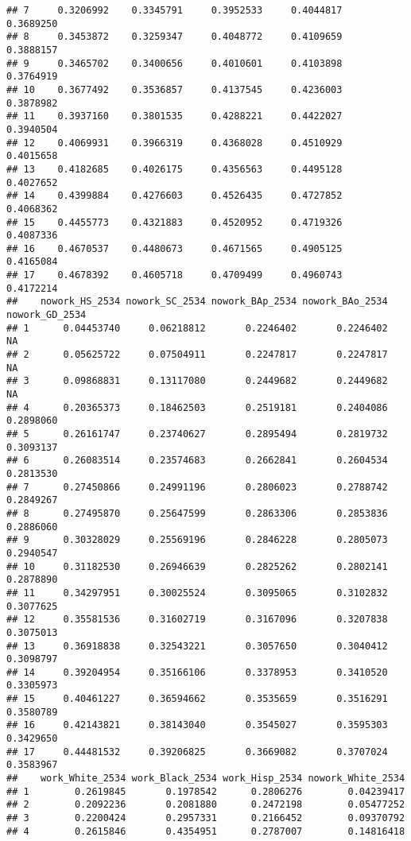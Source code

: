 \documentclass[
]{article}
\begin{document}
\begin{verbatim}
## 7     0.3206992    0.3345791     0.3952533     0.4044817    0.3689250
## 8     0.3453872    0.3259347     0.4048772     0.4109659    0.3888157
## 9     0.3465702    0.3400656     0.4010601     0.4103898    0.3764919
## 10    0.3677492    0.3536857     0.4137545     0.4236003    0.3878982
## 11    0.3937160    0.3801535     0.4288221     0.4422027    0.3940504
## 12    0.4069931    0.3966319     0.4368028     0.4510929    0.4015658
## 13    0.4182685    0.4026175     0.4356563     0.4495128    0.4027652
## 14    0.4399884    0.4276603     0.4526435     0.4727852    0.4068362
## 15    0.4455773    0.4321883     0.4520952     0.4719326    0.4087336
## 16    0.4670537    0.4480673     0.4671565     0.4905125    0.4165084
## 17    0.4678392    0.4605718     0.4709499     0.4960743    0.4172214
##    nowork_HS_2534 nowork_SC_2534 nowork_BAp_2534 nowork_BAo_2534 nowork_GD_2534
## 1      0.04453740     0.06218812       0.2246402       0.2246402             NA
## 2      0.05625722     0.07504911       0.2247817       0.2247817             NA
## 3      0.09868831     0.13117080       0.2449682       0.2449682             NA
## 4      0.20365373     0.18462503       0.2519181       0.2404086      0.2898060
## 5      0.26161747     0.23740627       0.2895494       0.2819732      0.3093137
## 6      0.26083514     0.23574683       0.2662841       0.2604534      0.2813530
## 7      0.27450866     0.24991196       0.2806023       0.2788742      0.2849267
## 8      0.27495870     0.25647599       0.2863306       0.2853836      0.2886060
## 9      0.30328029     0.25569196       0.2846228       0.2805073      0.2940547
## 10     0.31182530     0.26946639       0.2825262       0.2802141      0.2878890
## 11     0.34297951     0.30025524       0.3095065       0.3102832      0.3077625
## 12     0.35581536     0.31602719       0.3167096       0.3207838      0.3075013
## 13     0.36918838     0.32543221       0.3057650       0.3040412      0.3098797
## 14     0.39204954     0.35166106       0.3378953       0.3410520      0.3305973
## 15     0.40461227     0.36594662       0.3535659       0.3516291      0.3580789
## 16     0.42143821     0.38143040       0.3545027       0.3595303      0.3429650
## 17     0.44481532     0.39206825       0.3669082       0.3707024      0.3583967
##    work_White_2534 work_Black_2534 work_Hisp_2534 nowork_White_2534
## 1        0.2619845       0.1978542      0.2806276        0.04239417
## 2        0.2092236       0.2081880      0.2472198        0.05477252
## 3        0.2200424       0.2957331      0.2166452        0.09370792
## 4        0.2615846       0.4354951      0.2787007        0.14816418

\end{verbatim}
\end{document}
